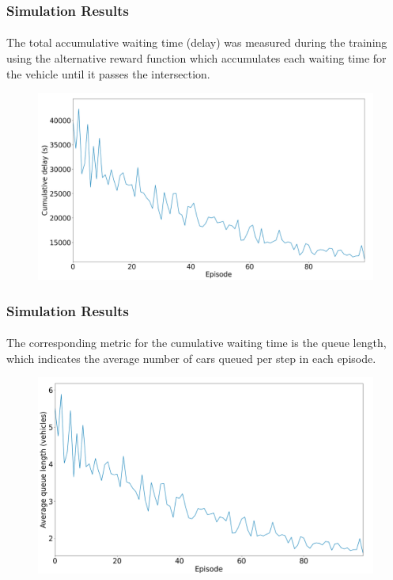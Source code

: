 \documentclass[aspectratio=169]{beamer}
\begin{document}
\begin{frame}
\frametitle{Simulation Results}
\framesubtitle{}
\vspace{1cm}
\begin{minipage}{0.4\textwidth}
The total accumulative waiting time (delay) was measured during the training using the alternative reward function which accumulates each waiting time for the vehicle until it passes the intersection.

\end{minipage}%
\hfill
\begin{minipage}{0.6\textwidth}
\begin{figure}
    \centering
    \includegraphics[width=1\linewidth]{images/train_delay.png}
\end{figure}
\end{minipage}
\end{frame}
\begin{frame}
\frametitle{Simulation Results}
\framesubtitle{}
\vspace{1cm}
\begin{minipage}{0.4\textwidth}
The corresponding metric for the cumulative waiting time is the queue length, which indicates the average number of cars queued per step in each episode.

\end{minipage}%
\hfill
\begin{minipage}{0.6\textwidth}
\begin{figure}
    \centering
    \includegraphics[width=1\linewidth]{images/train_queue.png}
\end{figure}
\end{minipage}
\end{frame}
\end{document}
